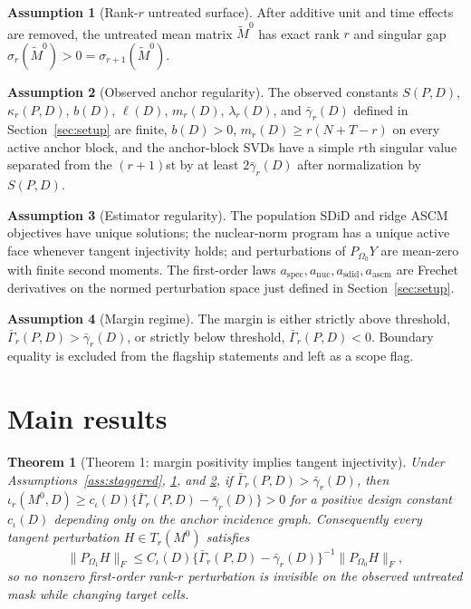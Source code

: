 \documentclass[11pt]{article}
\theoremstyle{definition}
\newtheorem{assumption}{Assumption}
\theoremstyle{plain}
\newtheorem{theorem}{Theorem}
\theoremstyle{remark}
\begin{document}
\begin{assumption}[Rank-$r$ untreated surface]\label{ass:rank}
After additive unit and time effects are removed, the untreated mean matrix
$\widetilde M^0$ has exact rank $r$ and singular gap
$\sigma_r(\widetilde M^0)>0=\sigma_{r+1}(\widetilde M^0)$.
\end{assumption}

\begin{assumption}[Observed anchor regularity]\label{ass:anchor}
The observed constants $S(P,D)$, $\kappa_r(P,D)$, $b(D)$, $\ell(D)$,
$m_r(D)$, $\lambda_r(D)$, and $\bar\gamma_r(D)$ defined in
Section~\ref{sec:setup} are finite, $b(D)>0$, $m_r(D)\ge r(N+T-r)$ on every
active anchor block, and the anchor-block SVDs have a simple $r$th singular
value separated from the $(r+1)$st by at least $2\bar\gamma_r(D)$ after
normalization by $S(P,D)$.
\end{assumption}

\begin{assumption}[Estimator regularity]\label{ass:estimator}
The population SDiD and ridge ASCM objectives have unique solutions; the
nuclear-norm program has a unique active face whenever tangent injectivity
holds; and perturbations of $P_{\Omega_0}Y$ are mean-zero with finite
second moments. The first-order laws
$a_{\mathrm{spec}},a_{\mathrm{nuc}},a_{\mathrm{sdid}},a_{\mathrm{ascm}}$ are
Frechet derivatives on the normed perturbation space just defined in
Section~\ref{sec:setup}.
\end{assumption}

\begin{assumption}[Margin regime]\label{ass:margin}
The margin is either strictly above threshold,
$\bar\Gamma_r(P,D)>\bar\gamma_r(D)$, or strictly below threshold,
$\bar\Gamma_r(P,D)<0$. Boundary equality is excluded from the flagship
statements and left as a scope flag.
\end{assumption}

\section{Main results}
\begin{theorem}[Theorem 1: margin positivity implies tangent injectivity]
\label{thm:nesting}
Under Assumptions~\ref{ass:staggered}, \ref{ass:rank}, and
\ref{ass:anchor}, if $\bar\Gamma_r(P,D)>\bar\gamma_r(D)$, then
$\iota_r(M^0,D)\ge c_{\iota}(D)\{\bar\Gamma_r(P,D)-\bar\gamma_r(D)\}>0$
for a positive design constant $c_{\iota}(D)$ depending only on the anchor
incidence graph. Consequently every tangent perturbation
$H\in T_r(M^0)$ satisfies
\[
\|P_{\Omega_1}H\|_F\le
C_{\iota}(D)\{\bar\Gamma_r(P,D)-\bar\gamma_r(D)\}^{-1}
\|P_{\Omega_0}H\|_F,
\]
so no nonzero first-order rank-$r$ perturbation is invisible on the observed
untreated mask while changing target cells.
\end{theorem}
\end{document}
